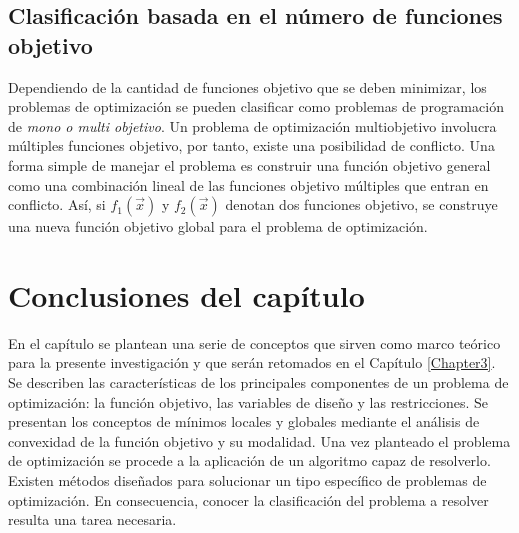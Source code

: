 \subsection{Clasificación basada en el número de funciones objetivo} 
Dependiendo de la cantidad de funciones objetivo que se deben minimizar, los problemas de optimización se pueden clasificar como problemas de programación de \textit{mono o multi objetivo}. Un problema de optimización multiobjetivo involucra múltiples funciones objetivo, por tanto, existe una posibilidad de conflicto. Una forma simple de manejar el problema es construir una función objetivo general como una combinación lineal de las funciones objetivo múltiples que entran en conflicto. Así, si $f_1(\vec{x})$ y $f_2 (\vec{x})$ denotan dos funciones objetivo, se construye una nueva función objetivo global para el problema de optimización.


\section{Conclusiones del capítulo}
En el capítulo se plantean una serie de conceptos que sirven como marco teórico para la presente investigación y que serán retomados en el Capítulo \ref{Chapter3}. Se describen las características de los principales componentes de un problema de optimización: la  función objetivo, las variables de diseño y las restricciones. Se presentan los conceptos de mínimos locales y globales mediante el análisis de convexidad de la función objetivo y su modalidad. Una vez planteado el problema de optimización se procede a la aplicación de un algoritmo capaz de resolverlo. Existen métodos diseñados para solucionar un tipo específico de problemas de optimización. En consecuencia, conocer la clasificación del problema a resolver resulta una tarea necesaria. 